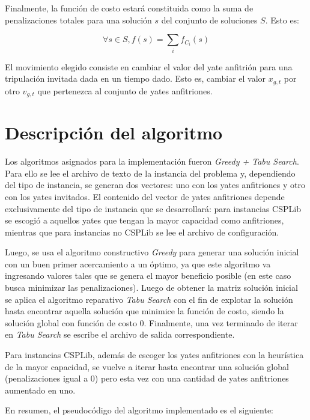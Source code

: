 \documentclass[letter, 10pt]{article}
\begin{document}
Finalmente, la función de costo estará constituida como la suma de penalizaciones totales para una solución $s$ del conjunto de soluciones $S$. Esto es:

\begin{equation}
    \forall s \in S, f(s)=\sum_i f_{C_i}(s)
\end{equation}

El movimiento elegido consiste en cambiar el valor del yate anfitrión para una tripulación invitada dada en un tiempo dado. Esto es, cambiar el valor $x_{g,t}$ por otro $v_{g,t}$ que pertenezca al conjunto de yates anfitriones. 

\section{Descripci\'on del algoritmo}

Los algoritmos asignados para la implementación fueron \textit{Greedy + Tabu Search}. Para ello se lee el archivo de texto de la instancia del problema y, dependiendo del tipo de instancia, se generan dos vectores: uno con los yates anfitriones y otro con los yates invitados. El contenido del vector de yates anfitriones depende exclusivamente del tipo de instancia que se desarrollará: para instancias CSPLib se escogió a aquellos yates que tengan la mayor capacidad como anfitriones, mientras que para instancias no CSPLib se lee el archivo de configuración.

Luego, se usa el algoritmo constructivo \textit{Greedy} para generar una solución inicial con un buen primer acercamiento a un óptimo, ya que este algoritmo va ingresando valores tales que se genera el mayor beneficio posible (en este caso busca minimizar las penalizaciones). Luego de obtener la matriz solución inicial se aplica el algoritmo reparativo \textit{Tabu Search} con el fin de explotar la solución hasta encontrar aquella solución que minimice la función de costo, siendo la solución global con función de costo 0. Finalmente, una vez terminado de iterar en \textit{Tabu Search} se escribe el archivo de salida correspondiente.

Para instancias CSPLib, además de escoger los yates anfitriones con la heurística de la mayor capacidad, se vuelve a iterar hasta encontrar una solución global (penalizaciones igual a 0) pero esta vez con una cantidad de yates anfitriones aumentado en uno.

En resumen, el pseudocódigo del algoritmo implementado es el siguiente:
\end{document}

